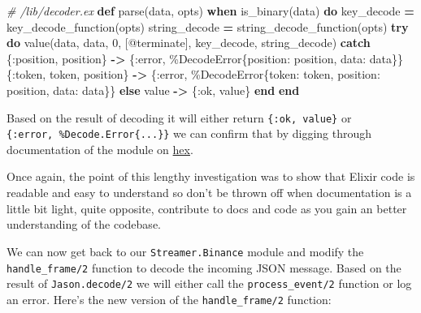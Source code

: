 \documentclass[
]{book}
\newenvironment{Shaded}{\begin{snugshade}}{\end{snugshade}}
\newcommand{\CommentTok}[1]{\textcolor[rgb]{0.56,0.35,0.01}{\textit{#1}}}
\newcommand{\ConstantTok}[1]{\textcolor[rgb]{0.00,0.00,0.00}{#1}}
\newcommand{\ControlFlowTok}[1]{\textcolor[rgb]{0.13,0.29,0.53}{\textbf{#1}}}
\newcommand{\DecValTok}[1]{\textcolor[rgb]{0.00,0.00,0.81}{#1}}
\newcommand{\KeywordTok}[1]{\textcolor[rgb]{0.13,0.29,0.53}{\textbf{#1}}}
\newcommand{\NormalTok}[1]{#1}
\newcommand{\OperatorTok}[1]{\textcolor[rgb]{0.81,0.36,0.00}{\textbf{#1}}}
\newcommand{\OtherTok}[1]{\textcolor[rgb]{0.56,0.35,0.01}{#1}}
\newcommand{\VariableTok}[1]{\textcolor[rgb]{0.00,0.00,0.00}{#1}}
\begin{document}
\begin{Shaded}
\begin{Highlighting}[]
  \CommentTok{\# /lib/decoder.ex}
  \KeywordTok{def}\NormalTok{ parse(data, opts) }\KeywordTok{when}\NormalTok{ is\_binary(data) }\KeywordTok{do}
\NormalTok{    key\_decode }\OperatorTok{=}\NormalTok{ key\_decode\_function(opts)}
\NormalTok{    string\_decode }\OperatorTok{=}\NormalTok{ string\_decode\_function(opts)}
    \ControlFlowTok{try} \KeywordTok{do}
\NormalTok{      value(data, data, }\DecValTok{0}\NormalTok{, [}\OtherTok{@terminate}\NormalTok{], key\_decode, string\_decode)}
    \ControlFlowTok{catch}
\NormalTok{      \{}\VariableTok{:position}\NormalTok{, position\} }\OperatorTok{{-}\textgreater{}}
\NormalTok{        \{}\VariableTok{:error}\NormalTok{, \%}\ConstantTok{DecodeError}\NormalTok{\{}\VariableTok{position:}\NormalTok{ position, }\VariableTok{data:}\NormalTok{ data\}\}}
\NormalTok{      \{}\VariableTok{:token}\NormalTok{, token, position\} }\OperatorTok{{-}\textgreater{}}
\NormalTok{        \{}\VariableTok{:error}\NormalTok{, \%}\ConstantTok{DecodeError}\NormalTok{\{}\VariableTok{token:}\NormalTok{ token, }\VariableTok{position:}\NormalTok{ position, }\VariableTok{data:}\NormalTok{ data\}\}}
    \ControlFlowTok{else}
\NormalTok{      value }\OperatorTok{{-}\textgreater{}}
\NormalTok{        \{}\VariableTok{:ok}\NormalTok{, value\}}
    \KeywordTok{end}
  \KeywordTok{end}
\end{Highlighting}
\end{Shaded}

Based on the result of decoding it will either return \texttt{\{:ok,\ value\}} or \texttt{\{:error,\ \%Decode.Error\{...\}\}} we can confirm that by digging through documentation of the module on \href{https://hexdocs.pm/jason/Jason.html\#decode/2}{hex}.

Once again, the point of this lengthy investigation was to show that Elixir code is readable and easy to understand so don't be thrown off when documentation is a little bit light, quite opposite, contribute to docs and code as you gain an better understanding of the codebase.

We can now get back to our \texttt{Streamer.Binance} module and modify the \texttt{handle\_frame/2} function to decode the incoming JSON message. Based on the result of \texttt{Jason.decode/2} we will either call the \texttt{process\_event/2} function or log an error. Here's the new version of the \texttt{handle\_frame/2} function:
\end{document}
